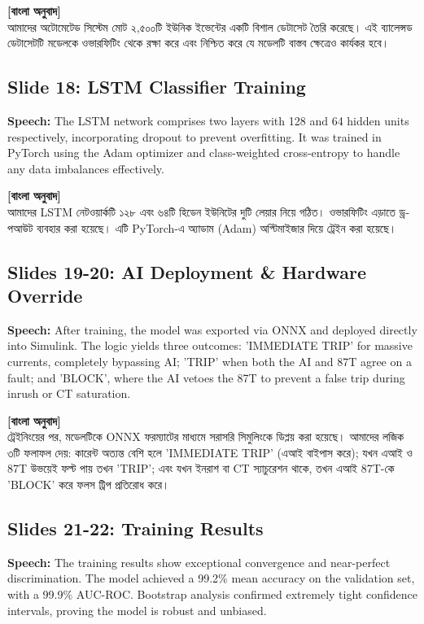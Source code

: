 \documentclass[12pt]{article}
\begin{document}
\begin{bengali}
\textbf{[বাংলা অনুবাদ]} \\
আমাদের অটোমেটেড সিস্টেম মোট ২,৫০০টি ইউনিক ইভেন্টের একটি বিশাল ডেটাসেট তৈরি করেছে। এই ব্যালেন্সড ডেটাসেটটি মডেলকে ওভারফিটিং থেকে রক্ষা করে এবং নিশ্চিত করে যে মডেলটি বাস্তব ক্ষেত্রেও কার্যকর হবে।
\end{bengali}

\subsection*{Slide 18: LSTM Classifier Training}
\textbf{Speech:} The LSTM network comprises two layers with 128 and 64 hidden units respectively, incorporating dropout to prevent overfitting. It was trained in PyTorch using the Adam optimizer and class-weighted cross-entropy to handle any data imbalances effectively.

\begin{bengali}
\textbf{[বাংলা অনুবাদ]} \\
আমাদের LSTM নেটওয়ার্কটি ১২৮ এবং ৬৪টি হিডেন ইউনিটের দুটি লেয়ার নিয়ে গঠিত। ওভারফিটিং এড়াতে ড্রপআউট ব্যবহার করা হয়েছে। এটি PyTorch-এ অ্যাডাম (Adam) অপ্টিমাইজার দিয়ে ট্রেইন করা হয়েছে।
\end{bengali}

\subsection*{Slides 19-20: AI Deployment \& Hardware Override}
\textbf{Speech:} After training, the model was exported via ONNX and deployed directly into Simulink. The logic yields three outcomes: 'IMMEDIATE TRIP' for massive currents, completely bypassing AI; 'TRIP' when both the AI and 87T agree on a fault; and 'BLOCK', where the AI vetoes the 87T to prevent a false trip during inrush or CT saturation.

\begin{bengali}
\textbf{[বাংলা অনুবাদ]} \\
ট্রেইনিংয়ের পর, মডেলটিকে ONNX ফরম্যাটের মাধ্যমে সরাসরি সিমুলিংকে ডিপ্লয় করা হয়েছে। আমাদের লজিক ৩টি ফলাফল দেয়: কারেন্ট অত্যন্ত বেশি হলে 'IMMEDIATE TRIP' (এআই বাইপাস করে); যখন এআই ও 87T উভয়েই ফল্ট পায় তখন 'TRIP'; এবং যখন ইনরাশ বা CT স্যাচুরেশন থাকে, তখন এআই 87T-কে 'BLOCK' করে ফলস ট্রিপ প্রতিরোধ করে।
\end{bengali}

\subsection*{Slides 21-22: Training Results}
\textbf{Speech:} The training results show exceptional convergence and near-perfect discrimination. The model achieved a 99.2\% mean accuracy on the validation set, with a 99.9\% AUC-ROC. Bootstrap analysis confirmed extremely tight confidence intervals, proving the model is robust and unbiased.
\end{document}
